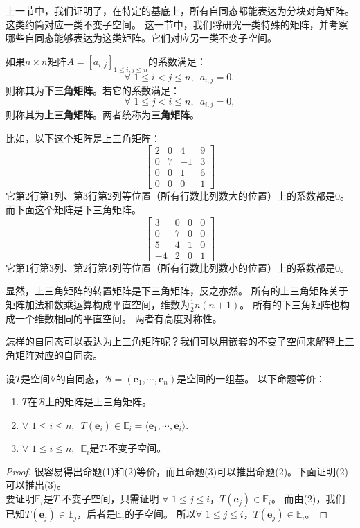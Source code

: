 \documentclass[12pt,UTF8,fontset=none]{ctexbook}
\begin{document}
上一节中，我们证明了，在特定的基底上，所有自同态都能表达为分块对角矩阵。这类约简对应一类不变子空间。
这一节中，我们将研究一类特殊的矩阵，并考察哪些自同态能够表达为这类矩阵。它们对应另一类不变子空间。

\begin{df}\label{df:6_3}
    如果$n\times n$矩阵$A = [a_{i,j}]_{1 \leqslant i , j \leqslant n}$的系数满足：
    $$ \forall \,\, 1 \leqslant i < j \leqslant n, \,\,\, a_{i,j} = 0,$$
    则称其为\textbf{下三角矩阵}。若它的系数满足：
    $$ \forall \,\, 1 \leqslant j < i \leqslant n, \,\,\, a_{i,j} = 0,$$
    则称其为\textbf{上三角矩阵}。两者统称为\textbf{三角矩阵}。
\end{df}

比如，以下这个矩阵是上三角矩阵：
$$ \begin{bmatrix} 2 & 0 & 4 & 9 \\ 0 & 7 & -1 & 3 \\ 0 & 0 & 1 & 6 \\ 0 & 0 & 0 & 1\end{bmatrix}$$
它第2行第1列、第3行第2列等位置（所有行数比列数大的位置）上的系数都是0。而下面这个矩阵是下三角矩阵。
$$ \begin{bmatrix} 3 & 0 & 0 & 0 \\ 0 & 7 & 0 & 0 \\ 5 & 4 & 1 & 0 \\ -4 & 2 & 0 & 1\end{bmatrix}$$
它第1行第3列、第2行第4列等位置（所有行数比列数小的位置）上的系数都是0。

显然，上三角矩阵的转置矩阵是下三角矩阵，反之亦然。
所有的上三角矩阵关于矩阵加法和数乘运算构成平直空间，维数为$\frac12 n(n+1)$。
所有的下三角矩阵也构成一个维数相同的平直空间。
两者有高度对称性。

怎样的自同态可以表达为上三角矩阵呢？我们可以用嵌套的不变子空间来解释上三角矩阵对应的自同态。
\begin{pp}\label{pp:6_5}
    设$T$是空间$\mathbb{V}$的自同态，$\mathcal{B} = (\mathbf{e}_1, \cdots , \mathbf{e}_n)$是空间的一组基。
    以下命题等价：
    \begin{enumerate}
        \item $T$在$\mathcal{B}$上的矩阵是上三角矩阵。
        \item $\forall \,\, 1 \leqslant i \leqslant n, \,\,\, T(\mathbf{e}_i) \in \mathbb{E}_i = \langle \mathbf{e}_1, \cdots , \mathbf{e}_i\rangle .$
        \item $\forall \,\, 1 \leqslant i \leqslant n, \,\,\, \mathbb{E}_i $是$T$-不变子空间。
    \end{enumerate}
\end{pp}
\begin{proof} %
    很容易得出命题(1)和(2)等价，而且命题(3)可以推出命题(2)。下面证明(2)可以推出(3)。\\
    要证明$\mathbb{E}_i $是$T$-不变子空间，只需证明
    $\forall \,\, 1 \leqslant j \leqslant i$，$T(\mathbf{e}_j) \in \mathbb{E}_i$。
    而由(2)，我们已知$T(\mathbf{e}_j) \in \mathbb{E}_j$，后者是$\mathbb{E}_i$的子空间。
    所以$\forall \,\, 1 \leqslant j \leqslant i$，$T(\mathbf{e}_j) \in \mathbb{E}_i$。
    
\end{proof}
\end{document}
